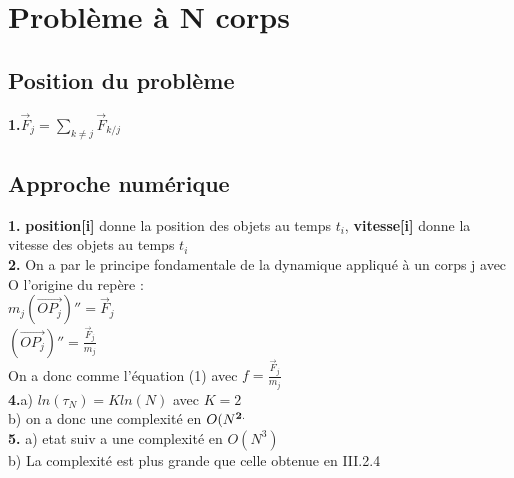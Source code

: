 \documentclass{article}
\begin{document}
\section{Problème à N corps}
\subsection{Position du problème}
{\bf 1.}$\vec F_j= \sum_{k \neq j} \vec F_{k/j}$

\subsection{Approche numérique}
{\bf 1.} {\bf position[i]} donne la position des objets au temps $t_i$, {\bf vitesse[i]} donne la vitesse des objets au temps $t_i$ \\
{\bf 2.} On a par le principe fondamentale de la dynamique appliqué à un corps j avec O l'origine du repère : \\
$ m_j (\overrightarrow{OP_j})'' = \vec F_j $ \\
$(\overrightarrow{OP_j})'' =\frac{ \vec F_j}{m_j} $ \\
On a donc comme l'équation (1) avec $f=\frac{ \vec F_j}{m_j}$ \\

{\bf 4.}a) $ln(\tau_N)=Kln(N)$ avec $K=2$ \\
b) on a donc une complexité en $O(N^{\bf 2.}$ \\
{\bf 5.} a) etat suiv a une complexité en $O(N^3)$ \\
b) La complexité est plus grande que celle obtenue en III.2.4 \\
 
\end{document}
